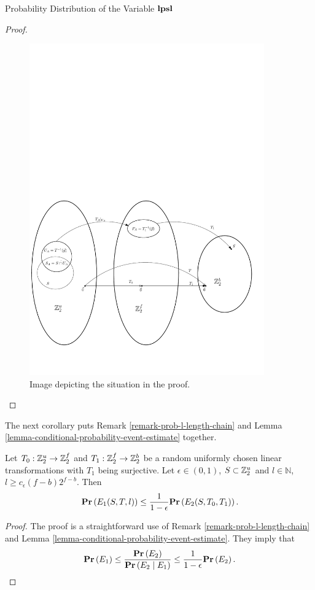 \begin{section}{Probability Distribution of the Variable \texorpdfstring{$\mathbf{lpsl}$}{lpsl}}
\begin{proof}
\begin{figure}
  \centering
    \includegraphics[width=0.9\textwidth]{images/elpsl_proof}
  \caption{Image depicting the situation in the proof.}
\end{figure}

\end{proof}

The next corollary puts Remark \ref{remark-prob-l-length-chain} and Lemma \ref{lemma-conditional-probability-event-estimate} together.
\begin{corollary}
\label{corollary-prob-e2-e1}
Let $T_0: \mathbb{Z}_{2}^{u} \rightarrow \mathbb{Z}_{2}^{f}$ and $T_1: \mathbb{Z}_{2}^{f} \rightarrow \mathbb{Z}_{2}^{b}$ be a random uniformly chosen linear transformations with $T_1$ being surjective. Let $\epsilon \in (0, 1)$, $S \subset \mathbb{Z}_{2}^{u}$ and $l \in \mathbb{N}$, $l \geq c_{\epsilon}(f - b)2 ^ {f - b}$. Then
\[
	\mathbf{Pr}\left(E_1(S, T, l)\right) \leq \frac{1}{1 - \epsilon} \mathbf{Pr}\left(E_2(S, T_0, T_1)\right) \text{.}
\]
\end{corollary}
\begin{proof}
The proof is a straightforward use of Remark \ref{remark-prob-l-length-chain} and Lemma \ref{lemma-conditional-probability-event-estimate}. They imply that
\[
	\mathbf{Pr}\left(E_1\right) \leq \frac{\mathbf{Pr}\left(E_2\right)}{\mathbf{Pr}\left(E_2 \mid E_1\right)} \leq \frac{1}{1 - \epsilon}\mathbf{Pr}\left(E_2\right) \text{.}
\]
\end{proof}


\end{section}
